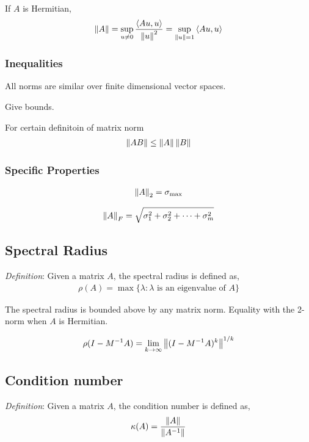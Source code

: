 \documentclass[12pt]{article}
\begin{document}
If \( A \) is Hermitian,
\begin{align*}
    \left\lVert A\right\rVert = \sup_{u\neq 0} \frac{\left\langle Au,u \right\rangle}{\left\lVert u\right\rVert^2} = \sup_{\left\lVert u\right\rVert=1} \left\langle Au,u \right\rangle
\end{align*}


\subsubsection{Inequalities}

All norms are similar over finite dimensional vector spaces.

Give bounds.

For certain definitoin of matrix norm
\begin{align*}
    \left\lVert A B\right\rVert \leq \left\lVert A\right\rVert\left\lVert B\right\rVert
\end{align*}


\subsubsection{Specific Properties}
\begin{align*}
    \left\lVert A\right\rVert_2 = \sigma_{\text{max}}
\end{align*}

\begin{align*}
    \left\lVert A\right\rVert_F = \sqrt{\sigma_1^2 + \sigma_2^2 + \cdots + \sigma_m^2}
\end{align*}


\subsection{Spectral Radius}
\textit{Definition}: Given a matrix \( A \), the spectral radius is defined as,
\begin{align*}
    \rho(A) = \max \{ \lambda : \lambda \text{ is an eigenvalue of } A \}
\end{align*}

The spectral radius is bounded above by any matrix norm. Equality with the 2-norm when \( A \) is Hermitian.

\begin{align*}
    \rho(I-M^{-1}A) = \lim_{k\to\infty} \left\lVert(I-M^{-1}A)^k\right\rVert^{1/k}
\end{align*}


\subsection{Condition number}
\textit{Definition}: Given a matrix \( A \), the condition number is defined as,
\begin{align*}
    \kappa(A) = \frac{\left\lVert A\right\rVert}{\left\lVert A^{-1}\right\rVert}
\end{align*}
\end{document}
